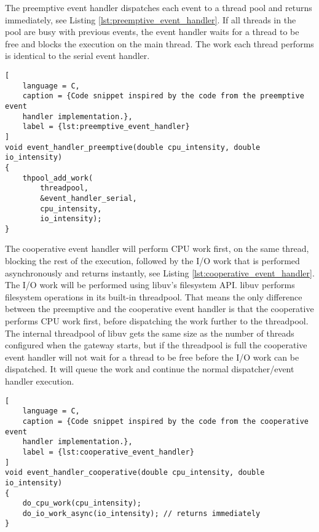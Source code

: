 The preemptive event handler dispatches each event to a thread pool and returns
immediately, see Listing \ref{lst:preemptive_event_handler}. If all threads in
the pool are busy with previous events, the event handler waits for a thread to
be free and blocks the execution on the main thread. The work each thread
performs is identical to the serial event handler.

\begin{lstlisting}[
    language = C,
    caption = {Code snippet inspired by the code from the preemptive event
    handler implementation.},
    label = {lst:preemptive_event_handler}
]
void event_handler_preemptive(double cpu_intensity, double io_intensity)
{
    thpool_add_work(
        threadpool,
        &event_handler_serial,
        cpu_intensity,
        io_intensity);
}
\end{lstlisting}

The cooperative event handler will perform CPU work first, on the same thread,
blocking the rest of the execution, followed by the I/O work that is performed
asynchronously and returns instantly, see Listing
\ref{lst:cooperative_event_handler}. The I/O work will be performed using
libuv's filesystem API. libuv performs filesystem operations in its built-in
threadpool. That means the only difference between the preemptive and the
cooperative event handler is that the cooperative performs CPU work first,
before dispatching the work further to the threadpool. The internal threadpool
of libuv gets the same size as the number of threads configured when the
gateway starts, but if the threadpool is full the cooperative event handler
will not wait for a thread to be free before the I/O work can be dispatched. It
will queue the work and continue the normal dispatcher/event handler execution.

\begin{lstlisting}[
    language = C,
    caption = {Code snippet inspired by the code from the cooperative event
    handler implementation.},
    label = {lst:cooperative_event_handler}
]
void event_handler_cooperative(double cpu_intensity, double io_intensity)
{
    do_cpu_work(cpu_intensity);
    do_io_work_async(io_intensity); // returns immediately
}
\end{lstlisting}


